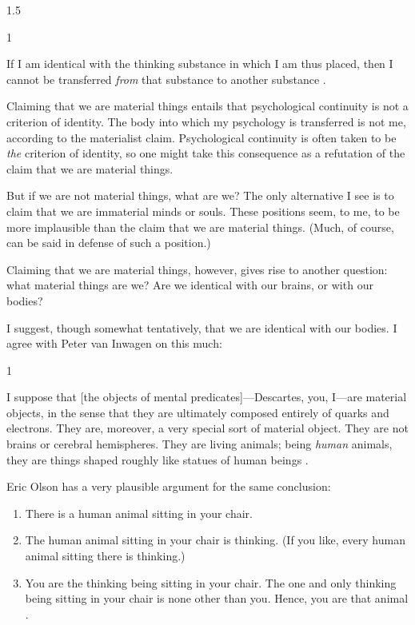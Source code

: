 \documentclass[11pt]{article}
\newenvironment{squote}{%
\begin{spacing}{1}
\begin{list}{}{%
\setlength{\labelwidth}{0pt}%
\rightmargin\leftmargin%
}
\item\relax
}{%
\end{list}%
\end{spacing}
}
\begin{document}
\begin{spacing}{1.5}
\begin{squote}
 If I am identical with the thinking substance in which I am thus
 placed, then I cannot be transferred {\em from} that substance to
 another substance \citep[107]{chisholm1979}.
\end{squote}

Claiming that we are material things entails that psychological
continuity is not a criterion of identity.  The body into which my
psychology is transferred is not me, according to the materialist
claim.  Psychological continuity is often taken to be {\em the}
criterion of identity, so one might take this consequence as a
refutation of the claim that we are material things.

But if we are not material things, what are we?  The only alternative
I see is to claim that we are immaterial minds or souls.  These
positions seem, to me, to be more implausible than the claim that we
are material things.  (Much, of course, can be said in defense of such
a position.)

Claiming that we are material things, however, gives rise to another
question: what material things are we?  Are we identical with our
brains, or with our bodies?

I suggest, though somewhat tentatively, that we are identical with our
bodies.  I agree with Peter van Inwagen on this much:

\begin{squote}
I suppose that [the objects of mental predicates]---Descartes, you,
I---are material objects, in the sense that they are ultimately
composed entirely of quarks and electrons.  They are, moreover, a very
special sort of material object.  They are not brains or cerebral
hemispheres.  They are living animals; being {\em human} animals, they
are things shaped roughly like statues of human beings
\citeyearpar[6]{inwagen1995}.
\end{squote}

Eric Olson has a very plausible argument for the same conclusion:

\begin{enumerate}
  \item There is a human animal sitting in your chair.
  \item The human animal sitting in your chair is thinking. (If you
    like, every human animal sitting there is thinking.)
  \item You are the thinking being sitting in your chair. The one and
    only thinking being sitting in your chair is none other than
    you. Hence, you are that animal \citeyearpar[354]{olson2003a}.
\end{enumerate}


\end{spacing}
\end{document}
